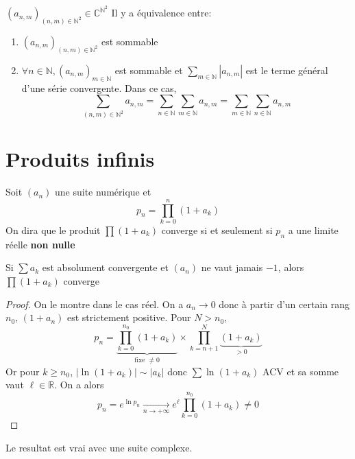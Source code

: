 \begin{cor}
    \Hyp $(a_{n, m})_{(n, m)\in\mathbb N^2}\in\mathbb C^{\mathbb N^2}$
    \Conc Il y a équivalence entre: \begin{enumerate}[left=1.2cm,label=\alph{enumi}.]
        \item $(a_{n,m})_{(n,m)\in\mathbb N^2}$ est sommable
        \item $\forall n\in\mathbb N, (a_{n, m})_{m\in\mathbb N}$ est sommable et $\sum_{m\in\mathbb N}|a_{n,m}|$ est le terme général d'une série convergente. Dans ce cas, \[
                \sum_{(n, m)\in\mathbb N^2}a_{n, m}=\sum_{n\in\mathbb N}\sum_{m\in\mathbb N}a_{n,m}=\sum_{m\in\mathbb N}\sum_{n\in\mathbb N}a_{n, m}
            \]
    \end{enumerate}
\end{cor}

\section{Produits infinis}

Soit $(a_n)$ une suite numérique et \[
    p_n=\prod_{k=0}^n(1+a_k)
\]
On dira que le produit $\prod(1+a_k)$ converge si et seulement si $p_n$ a une limite réelle \textbf{non nulle}

\begin{res}
    Si $\sum a_k$ est absolument convergente et $(a_n)$ ne vaut jamais $-1$, alors $\prod(1+a_k)$ converge
\end{res}

\begin{proof}
    On le montre dans le cas réel. On a $a_n\longrightarrow 0$ donc à partir d'un certain rang $n_0$, $(1+a_n)$ est strictement positive. Pour $N>n_0$, \[
        p_n=\underbrace{\prod_{k=0}^{n_0}(1+a_k)}_{\text{fixe } \neq 0}\times \prod_{k=n+1}^{N}\underbrace{(1+a_k)}_{>0}
    \]
    Or pour $k\geq n_0$, $|\ln(1+a_k)|\sim |a_k|$ donc $\sum \ln(1+a_k)$ ACV et sa somme vaut $\ell\in\mathbb R$. On a alors \[
        p_n=e^{\ln p_n}\xrightarrow[n\to+\infty]{}e^\ell \prod_{k=0}^{n_0}(1+a_k) \neq 0
    \]
\end{proof}

\begin{rem}
    Le resultat est vrai avec une suite complexe.
\end{rem}

